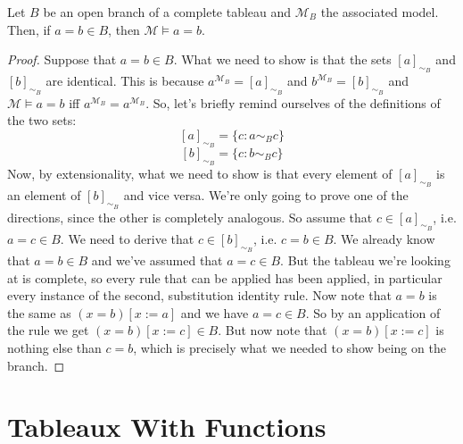 \begin{enumerate}[\thesection.1]
		\begin{lemma}
		Let $B$ be an open branch of a complete tableau and $\mathcal{M}_B$ the associated model. Then, if $a=b\in B$, then $\mathcal{M}\vDash a=b$.
		\end{lemma}
		\begin{proof}
		Suppose that $a=b\in B$. What we need to show is that the sets $[a]_{\sim_B}$ and $[b]_{\sim_B}$ are identical. This is because $a^{\mathcal{M}_B}=[a]_{\sim_B}$ and $b^{\mathcal{M}_B}=[b]_{\sim_B}$ and $\mathcal{M}\vDash a=b$ iff $a^{\mathcal{M}_B}=a^{\mathcal{M}_B}$. So, let's briefly remind ourselves of the definitions of the two sets:
		\[[a]_{\sim_B}=\{c:a\sim_Bc\}\]
		\[[b]_{\sim_B}=\{c:b\sim_Bc\}\]
		Now, by extensionality, what we need to show is that every element of $[a]_{\sim_B}$ is an element of $[b]_{\sim_B}$ and vice versa. We're only going to prove one of the directions, since the other is completely analogous. So assume that $c\in [a]_{\sim_B}$, i.e. $a=c\in B$. We need to derive that $c\in [b]_{\sim_B}$, i.e. $c=b\in B$. We already know that $a=b\in B$ and we've assumed that $a=c\in B$. But the tableau we're looking at is complete, so every rule that can be applied has been applied, in particular every instance of the second, substitution identity rule. Now note that $a=b$ is the same as $(x=b)[x:=a]$ and we have $a=c\in B$. So by an application of the rule we get $(x=b)[x:=c]\in B$. But now note that $(x=b)[x:=c]$ is nothing else than $c=b$, which is precisely what we needed to show being on the branch.
		\end{proof}

	\end{enumerate}

\section{Tableaux With Functions}
\label{fo_tableaux_functions}

